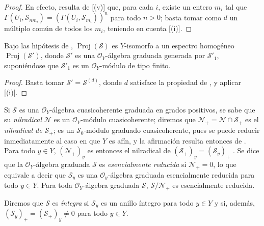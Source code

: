\documentclass[oneside,10pt]{amsart}
\newcommand{\oldpage}[2][]{\marginnote{\normalfont\footnotesize\textbf{#1}~|~#2}\ignorespaces}
\let\EGAOriginalLabel\label
\renewcommand{\label}[1]{\phantomsection\EGAOriginalLabel{#1}}
\begin{document}
\begin{proof}
En efecto, resulta de [(v)] que, para cada $i$, existe un entero $m_i$ tal que $\Gamma(U_i,\mathcal{S}_{nm_i})=(\Gamma(U_i,\mathcal{S}_{m_i}))^n$ para todo $n>0$; basta tomar como $d$ un múltiplo común de todos los $m_i$, teniendo en cuenta [(i)].
\end{proof}

\begin{corollary}[3.1.11]
\label{II.3.1.11-fr}
Bajo las hipótesis de , $\operatorname{Proj}(\mathcal{S})$ es $Y$-isomorfo a un espectro homogéneo $\operatorname{Proj}(\mathcal{S}')$, donde $\mathcal{S}'$ es una $\mathcal{O}_Y$-álgebra graduada generada por $\mathcal{S}'_1$, suponiéndose que $\mathcal{S}'_1$ es un $\mathcal{O}_Y$-módulo de tipo finito.
\end{corollary}

\begin{proof}
Basta tomar $\mathcal{S}'=\mathcal{S}^{(d)}$, donde $d$ satisface la propiedad de , y aplicar [(i)].
\end{proof}

\begin{env}[3.1.12]
\label{II.3.1.12-fr}
Si $\mathcal{S}$ es una $\mathcal{O}_Y$-álgebra cuasicoherente graduada en grados positivos, se sabe  que su \emph{nilradical} $\mathcal{N}$ es un $\mathcal{O}_Y$-módulo cuasicoherente; diremos que $\mathcal{N}_+=\mathcal{N}\cap\mathcal{S}_+$ es el \emph{nilradical de $\mathcal{S}_+$}; es un $\mathcal{S}_0$-módulo graduado cuasicoherente, pues se puede reducir inmediatamente al caso en que $Y$ es afín, y la afirmación resulta entonces de .
Para todo $y\in Y$, $(\mathcal{N}_+)_y$ es entonces el nilradical de $(\mathcal{S}_+)_y=(\mathcal{S}_y)_+$ .
Se dice que la $\mathcal{O}_Y$-álgebra graduada $\mathcal{S}$ es \emph{esencialmente reducida} si $\mathcal{N}_+=0$, lo que equivale
\oldpage[II]{53}
a decir que $\mathcal{S}_y$ es una $\mathcal{O}_y$-álgebra graduada esencialmente reducida para todo $y\in Y$.
Para toda $\mathcal{O}_Y$-álgebra graduada $\mathcal{S}$, $\mathcal{S}/\mathcal{N}_+$ es esencialmente reducida.

Diremos que $\mathcal{S}$ es \emph{íntegra} si $\mathcal{S}_y$ es un anillo íntegro para todo $y\in Y$ y si, además, $(\mathcal{S}_y)_+=(\mathcal{S}_+)_y\neq0$ para todo $y\in Y$.
\end{env}
\end{document}

